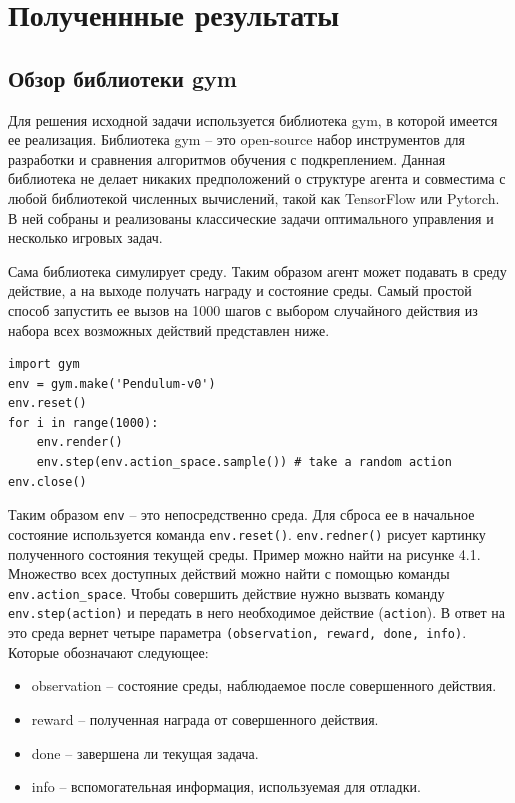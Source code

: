 \chapter{Полученнные результаты}\label{chap1}

\section{Обзор библиотеки gym}\label{1sec:optimal-control}

Для решения исходной задачи используется библиотека gym, в которой имеется ее реализация. Библиотека gym -- это open-source набор инструментов для разработки и сравнения алгоритмов обучения с подкреплением. Данная библиотека не делает никаких предположений о структуре агента и совместима с любой библиотекой численных вычислений, такой как TensorFlow или Pytorch. В ней собраны и реализованы классические задачи оптимального управления и несколько игровых задач. 

Сама библиотека симулирует среду. Таким образом агент может подавать в среду действие, а на выходе получать награду и состояние среды. Самый простой способ запустить ее вызов на 1000 шагов с выбором случайного действия из набора всех возможных действий представлен ниже. 

\begin{verbatim}
import gym 
env = gym.make('Pendulum-v0')
env.reset() 
for i in range(1000): 
    env.render() 
    env.step(env.action_space.sample()) # take a random action 
env.close()
\end{verbatim}

Таким образом \texttt{env} -- это непосредственно среда. Для сброса ее в начальное состояние используется команда \texttt{env.reset()}. \texttt{env.redner()} рисует картинку полученного состояния текущей среды. Пример можно найти на рисунке 4.1. Множество всех доступных действий можно найти с помощью команды \texttt{env.action_space}. Чтобы совершить действие нужно вызвать команду \texttt{env.step(action)} и передать в него необходимое действие (\texttt{action}). В ответ на это среда вернет четыре параметра \texttt{(observation, reward, done, info)}. Которые обозначают следующее:
\begin{itemize}
	\item observation -- состояние среды, наблюдаемое после совершенного действия.
	\item reward -- полученная награда от совершенного действия.
	\item done -- завершена ли текущая задача.
	\item info -- вспомогательная информация, используемая для отладки. 
\end{itemize}
 \newpage



